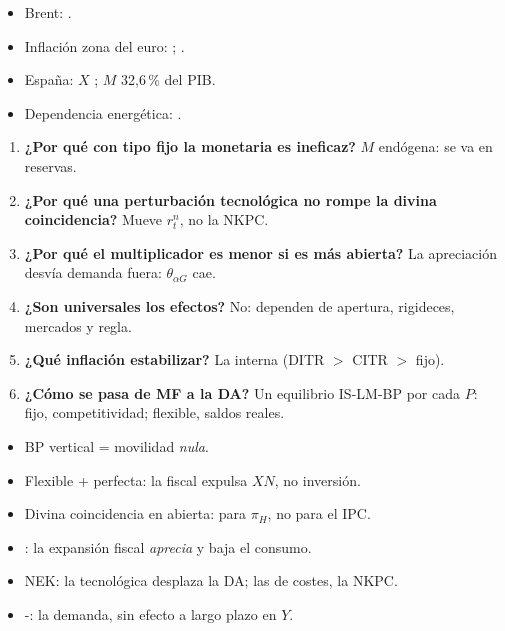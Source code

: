 \documentclass{article}
\begin{document}
\begin{columnas}
\anexorepaso
{}
\begin{itemize}
\item Brent: .
\item Inflación zona del euro: ; .
\item España: $X$ ; $M$ 32,6\,\% del PIB.
\item Dependencia energética: .
\end{itemize}
\begin{enumerate}
\item \textbf{¿Por qué con tipo fijo la monetaria es ineficaz?} $M$ endógena: se va en reservas.
\item \textbf{¿Por qué una perturbación tecnológica no rompe la divina coincidencia?} Mueve $r^n_t$, no la NKPC.
\item \textbf{¿Por qué el multiplicador es menor si es más abierta?} La apreciación desvía demanda fuera: $\theta_{\alpha G}$ cae.
\item \textbf{¿Son universales los efectos?} No: dependen de apertura, rigideces, mercados y regla.
\item \textbf{¿Qué inflación estabilizar?} La interna (DITR $>$ CITR $>$ fijo).
\item \textbf{¿Cómo se pasa de MF a la DA?} Un equilibrio IS-LM-BP por cada $P$: fijo, competitividad; flexible, saldos reales.
\end{enumerate}
\begin{trampa}
\begin{itemize}
\item BP vertical = movilidad \emph{nula}.
\item Flexible + perfecta: la fiscal expulsa $XN$, no inversión.
\item Divina coincidencia en abierta: para $\pi_H$, no para el IPC.
\item {}: la expansión fiscal \emph{aprecia} y baja el consumo.
\item NEK: la tecnológica desplaza la DA; las de costes, la NKPC.
\item {}-: la demanda, sin efecto a largo plazo en $Y$.
\end{itemize}
\end{trampa}

\end{columnas}
\end{document}
